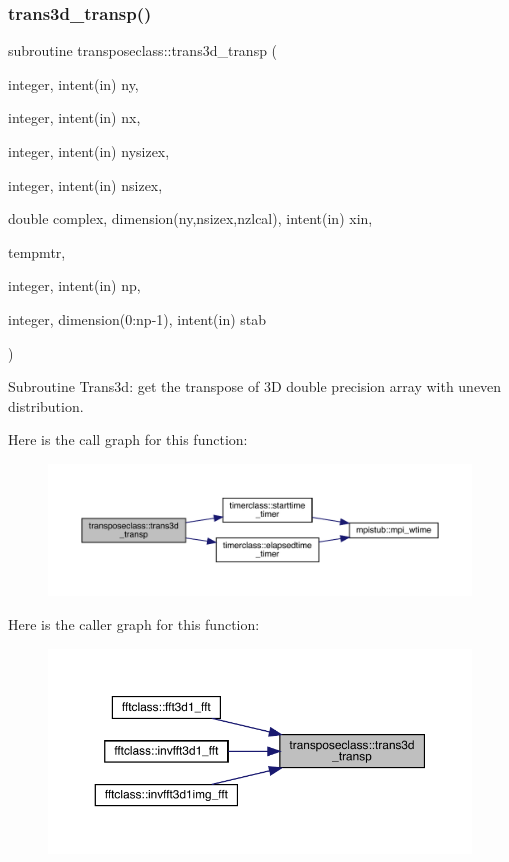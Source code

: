 \subsubsection{\texorpdfstring{trans3d\_transp()}{trans3d\_transp()}}
{\footnotesize\ttfamily subroutine transposeclass\+::trans3d\+\_\+transp (\begin{DoxyParamCaption}\item[{integer, intent(in)}]{ny,  }\item[{integer, intent(in)}]{nx,  }\item[{integer, intent(in)}]{nysizex,  }\item[{integer, intent(in)}]{nsizex,  }\item[{double complex, dimension(ny,nsizex,nzlcal), intent(in)}]{xin,  }\item[{}]{tempmtr,  }\item[{integer, intent(in)}]{np,  }\item[{integer, dimension(0\+:np-\/1), intent(in)}]{stab }\end{DoxyParamCaption})}



Subroutine Trans3d\+: get the transpose of 3D double precision array with uneven distribution. 

Here is the call graph for this function\+:\nopagebreak
\begin{figure}[H]
\begin{center}
\leavevmode
\includegraphics[width=350pt]{namespacetransposeclass_a53eeae5e11acd8c39e03fb8672f2d90e_cgraph}
\end{center}
\end{figure}
Here is the caller graph for this function\+:\nopagebreak
\begin{figure}[H]
\begin{center}
\leavevmode
\includegraphics[width=350pt]{namespacetransposeclass_a53eeae5e11acd8c39e03fb8672f2d90e_icgraph}
\end{center}
\end{figure}
